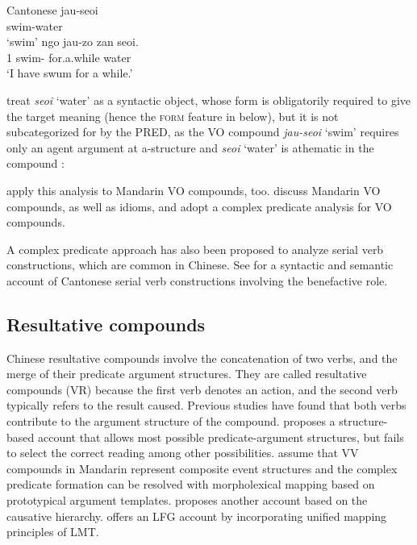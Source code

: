 \documentclass[output=paper,chinesefont,hidelinks]{langscibook}
\begin{document}
\ea%
    \label{ex:Sinitic:47} Cantonese
\ea    \gll jau-seoi\\
         swim-water\\
    \glt`swim'
\ex    \gll ngo  jau-zo    zan     seoi.\\
         {1\SG}   swim-{\PFV}   for.a.while   water\\
    \glt `I have swum for a while.' \citep[389, ex.~18]{BodomoYuChe2017}
    \z\z

\citet{BodomoYuChe2017} treat \textit{seoi} `water' as a syntactic object, whose form is obligatorily required to give the target meaning (hence the \textsc{form} feature in {\OBJ} below), but it is not subcategorized for by the PRED, as the VO compound \textit{jau-seoi} `swim' requires only an agent argument at a-structure and \textit{seoi} `water' is athematic in the compound \citep[389]{BodomoYuChe2017}:

\ea%
    \label{ex:Sinitic:48}
    \z

\citet{BodomoYuChe2017} apply this analysis to Mandarin VO compounds, too. \citet{CheBodomo2018} discuss Mandarin VO compounds, as well as idioms, and adopt a complex predicate analysis for VO compounds.

A complex predicate approach has also been proposed to analyze serial verb constructions, which are common in Chinese. See \citet{BodomoLamYu2003} for a syntactic and semantic account of Cantonese serial verb constructions involving the benefactive role.

\subsection{Resultative compounds}
\label{sec:Sinitic:4.3.2}

Chinese resultative compounds involve the concatenation of two verbs, and the merge of their predicate argument structures. They are called resultative compounds (VR) because the first verb denotes an action, and the second verb typically refers to the result caused. Previous studies have found that both verbs contribute to the argument structure of the compound. \citet{Li1990} proposes a structure-based account that allows most possible predicate-argument structures, but fails to select the correct reading among other possibilities. \citet{HuangLin1992} assume that VV compounds in Mandarin represent composite event structures and the complex predicate formation can be resolved with morpholexical mapping based on prototypical argument templates. \citet{Li1995} proposes another account based on the causative hierarchy. \citet{Her2004,Her2007a} offers an LFG account by incorporating unified mapping principles of LMT.
\end{document}
